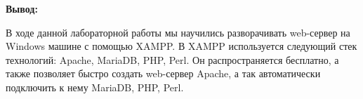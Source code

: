 \documentclass[a4paper,14pt]{extarticle}
\begin{document}
    \textbf{Вывод:}

    В ходе данной лабораторной работы мы научились разворачивать web-сервер
    на Windows машине с помощью XAMPP. В XAMPP используется следующий стек 
    технологий: Apache, MariaDB, PHP, Perl. Он распространяется бесплатно, а также
    позволяет быстро создать web-сервер Apache, а так автоматически подключить к 
    нему MariaDB, PHP, Perl.

    
\end{document}
